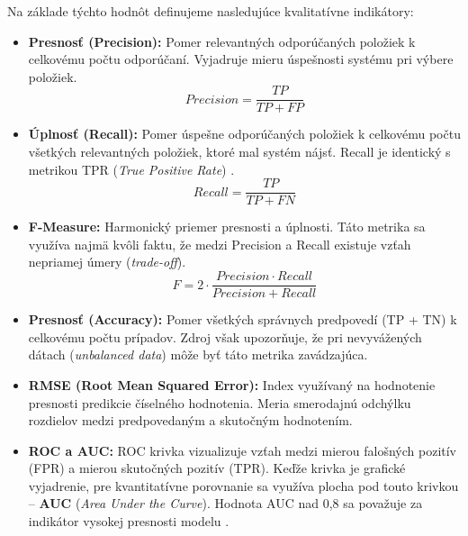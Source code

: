 Na základe týchto hodnôt definujeme nasledujúce kvalitatívne indikátory:

\begin{itemize}
    \item \textbf{Presnosť (Precision):} Pomer relevantných odporúčaných položiek k celkovému počtu odporúčaní. Vyjadruje mieru úspešnosti systému pri výbere položiek.
    $$Precision = \frac{TP}{TP + FP}$$

    \item \textbf{Úplnosť (Recall):} Pomer úspešne odporúčaných položiek k celkovému počtu všetkých relevantných položiek, ktoré mal systém nájsť. Recall je identický s metrikou TPR (\textit{True Positive Rate}) \cite{electronics11010141}.
    $$Recall = \frac{TP}{TP + FN}$$

    \item \textbf{F-Measure:} Harmonický priemer presnosti a úplnosti. Táto metrika sa využíva najmä kvôli faktu, že medzi Precision a Recall existuje vzťah nepriamej úmery (\textit{trade-off}).
    $$F = 2 \cdot \frac{Precision \cdot Recall}{Precision + Recall}$$

    \item \textbf{Presnosť (Accuracy):} Pomer všetkých správnych predpovedí (TP + TN) k celkovému počtu prípadov. Zdroj \cite{electronics11010141} však upozorňuje, že pri nevyvážených dátach (\textit{unbalanced data}) môže byť táto metrika zavádzajúca.

    \item \textbf{RMSE (Root Mean Squared Error):} Index využívaný na hodnotenie presnosti predikcie číselného hodnotenia. Meria smerodajnú odchýlku rozdielov medzi predpovedaným a skutočným hodnotením.

    \item \textbf{ROC a AUC:} ROC krivka vizualizuje vzťah medzi mierou falošných pozitív (FPR) a mierou skutočných pozitív (TPR). Keďže krivka je grafické vyjadrenie, pre kvantitatívne porovnanie sa využíva plocha pod touto krivkou – \textbf{AUC} (\textit{Area Under the Curve}). Hodnota AUC nad 0,8 sa považuje za indikátor vysokej presnosti modelu \cite{electronics11010141}.
\end{itemize}




